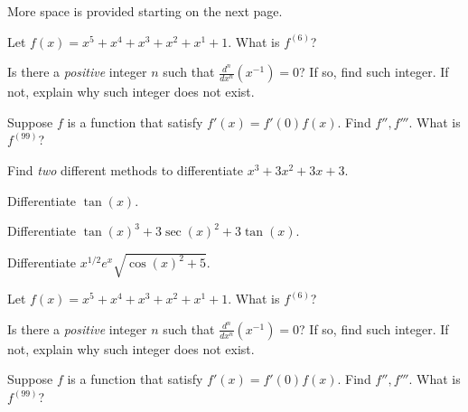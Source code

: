 \documentclass[../main.tex]{subfiles}
\begin{document}
More space is provided starting on the next page.

\bigskip
\begin{example}
  Let \(f(x) = x^{5} + x^{4} + x^{3} + x^{2} + x^{1} + 1\). What is \(f^{(6)}\)?
\end{example}

\bigskip
\begin{example}
  Is there a \emph{positive} integer \(n\) such that \(\frac{d^{n}}{dx^{n}} \left( x^{-1} \right) = 0\)? If so, find such integer. If not, explain why such integer does not exist.
\end{example}

\bigskip

\begin{example}
  Suppose \(f\) is a function that satisfy \(f'(x) = f'(0) f(x)\). Find \(f'', f'''\). What is \(f^{(99)}\)?
\end{example}

\bigskip
\begin{example}
  Find \emph{two} different methods to differentiate \(x^{3} + 3x^{2} + 3x + 3\).
\end{example}

\bigskip
\begin{example}
  Differentiate \(\tan(x)\). 
\end{example}

\bigskip
\begin{example}
  Differentiate \(\tan(x)^{3} + 3 \sec(x)^{2} + 3\tan(x)\). 
\end{example}

\bigskip
\begin{example}
  Differentiate \(x^{1/2} e^{x} \sqrt{\cos(x)^{2} + 5}\).
\end{example}
\bigskip

\clearpage
\setcounter{thm}{2}
\begin{example}
  Let \(f(x) = x^{5} + x^{4} + x^{3} + x^{2} + x^{1} + 1\). What is \(f^{(6)}\)?
\end{example}
\vfill

\begin{example}
  Is there a \emph{positive} integer \(n\) such that \(\frac{d^{n}}{dx^{n}} \left( x^{-1} \right) = 0\)? If so, find such integer. If not, explain why such integer does not exist.
\end{example}
\vfill

\begin{example}
  Suppose \(f\) is a function that satisfy \(f'(x) = f'(0) f(x)\). Find \(f'', f'''\). What is \(f^{(99)}\)?
\end{example}
\vfill
\end{document}
